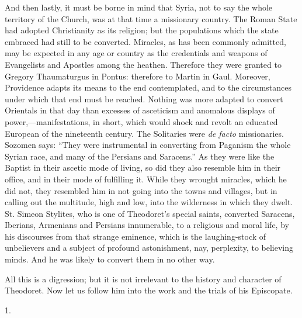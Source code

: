 And then lastly, it must be borne in mind that Syria, not to say
the whole territory of the Church, was at that time a missionary
country. The Roman State had adopted Christianity as its religion; but
the populations which the state embraced had still to be converted.
Miracles, as has been commonly admitted, may be expected in any age or
country as the credentials and weapons of Evangelists and Apostles
among the heathen. Therefore they were granted to Gregory Thaumaturgus
in Pontus: therefore to Martin in Gaul. Moreover, Providence adapts
its means to the end contemplated, and to the circumstances
under which that end must be reached. Nothing was more adapted to
convert Orientals in that day than excesses of asceticism and
anomalous displays of power,—manifestations, in short, which would
shock and revolt an educated European of the nineteenth century. The
Solitaries were \emph{de facto} missionaries. Sozomen says: ``They
were instrumental in converting from Paganism the whole Syrian race,
and many of the Persians and Saracens.'' As they were like the
Baptist in their ascetic mode of living, so did they also resemble him
in their office, and in their mode of fulfilling it. While they
wrought miracles, which he did not, they resembled him in not going
into the towns and villages, but in calling out the multitude, high
and low, into the wilderness in which they dwelt. St. Simeon Stylites,
who is one of Theodoret's special saints, converted Saracens,
Iberians, Armenians and Persians innumerable, to a religious and moral
life, by his discourses from that strange eminence, which is the
laughing-stock of unbelievers and a subject of profound astonishment,
nay, perplexity, to believing minds. And he was likely to convert them
in no other way.

All this is a digression; but it is not irrelevant to the history
and character of Theodoret. Now let us follow him into the work and
the trials of his Episcopate.


1.

